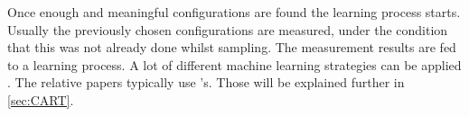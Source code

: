 Once enough and meaningful configurations are found the learning process starts. Usually the previously chosen configurations are measured, under the condition that this was not already done whilst sampling. The measurement results are fed to a learning process. A lot of different machine learning strategies can be applied \cite{VAMOSConference}. The relative papers typically use \CART's. Those will be explained further in \cref{sec:CART}.


%







